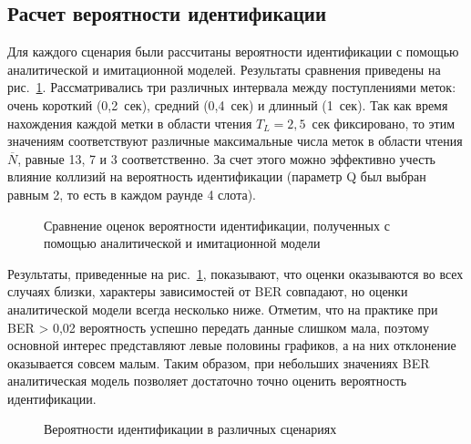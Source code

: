 \subsection{Расчет вероятности идентификации}

Для каждого сценария были рассчитаны вероятности идентификации с помощью аналитической и имитационной моделей. Результаты сравнения приведены на рис.~\ref{fig:ch3_results_prob_cmp}. Рассматривались три различных интервала между поступлениями меток: очень короткий (0,2~сек), средний (0,4~сек) и длинный (1~сек). Так как время нахождения каждой метки в области чтения $T_L = 2,5$~сек фиксировано, то этим значениям соответствуют различные максимальные числа меток в области чтения $\overline{N}$, равные 13, 7 и 3 соответственно. За счет этого можно эффективно учесть влияние коллизий на вероятность идентификации (параметр Q был выбран равным 2, то есть в каждом раунде 4 слота).

\begin{figure}[htb]
  \caption{Сравнение оценок вероятности идентификации, полученных с помощью аналитической и имитационной модели}
  \label{fig:ch3_results_prob_cmp}
\end{figure}

Результаты, приведенные на рис.~\ref{fig:ch3_results_prob_cmp}, показывают, что оценки оказываются во всех случаях близки, характеры зависимостей от BER совпадают, но оценки аналитической модели всегда несколько ниже. Отметим, что на практике при BER > 0,02 вероятность успешно передать данные слишком мала, поэтому основной интерес представляют левые половины графиков, а на них отклонение оказывается совсем малым. Таким образом, при небольших значениях BER аналитическая модель позволяет достаточно точно оценить вероятность идентификации.

\begin{figure}[htb]
  \caption{Вероятности идентификации в различных сценариях}
  \label{fig:ch3_results_probs}
\end{figure}

